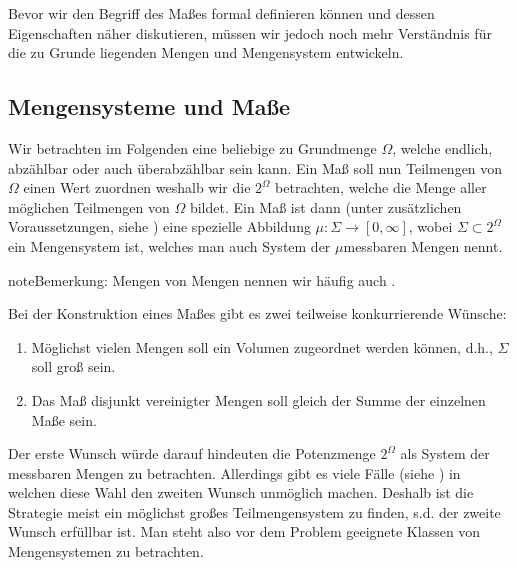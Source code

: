 \documentclass[letterpaper,10pt,german]{jupyterBook}
\begin{document}
\sphinxAtStartPar
Bevor wir den Begriff des Maßes formal definieren können und dessen Eigenschaften näher diskutieren, müssen wir jedoch noch mehr Verständnis für die zu Grunde liegenden Mengen und Mengensystem entwickeln.


\subsection{Mengensysteme und Maße}
\label{\detokenize{masstheorie/masstheorie:mengensysteme-und-masze}}\label{\detokenize{masstheorie/masstheorie:s-sigmaalg}}
\sphinxAtStartPar
Wir betrachten im Folgenden eine beliebige zu Grundmenge \(\Omega\), welche endlich, abzählbar oder auch überabzählbar sein kann. Ein Maß soll nun Teilmengen von \(\Omega\) einen Wert zuordnen weshalb wir die  \(2^\Omega\) betrachten, welche die Menge aller möglichen Teilmengen von \(\Omega\) bildet. Ein Maß ist dann (unter zusätzlichen Voraussetzungen, siehe {\hyperref[\detokenize{masstheorie/masstheorie:def:mass}]{}}) eine spezielle Abbildung \(\mu:\Sigma\to[0,\infty]\), wobei \(\Sigma\subset 2^\Omega\) ein Mengensystem ist, welches man auch System der \(\mu\)\sphinxhyphen{}messbaren Mengen nennt.

\begin{sphinxadmonition}{note}{Bemerkung:}
\sphinxAtStartPar
Mengen von Mengen nennen wir häufig auch .
\end{sphinxadmonition}

\sphinxAtStartPar
Bei der Konstruktion eines Maßes gibt es zwei teilweise konkurrierende Wünsche:
\begin{enumerate}
%
\item {} 
\sphinxAtStartPar
Möglichst vielen Mengen soll ein Volumen zugeordnet werden können, d.h., \(\Sigma\) soll groß sein.

\item {} 
\sphinxAtStartPar
Das Maß disjunkt vereinigter Mengen soll gleich der Summe der einzelnen Maße sein.

\end{enumerate}

\sphinxAtStartPar
Der erste Wunsch würde darauf hindeuten die Potenzmenge \(2^\Omega\) als System der messbaren Mengen zu betrachten. Allerdings gibt es viele Fälle (siehe {\hyperref[\detokenize{masstheorie/masstheorie:s-vitali}]{}}) in welchen diese Wahl den zweiten Wunsch unmöglich machen. Deshalb ist die Strategie meist ein möglichst großes Teilmengensystem zu finden, s.d. der zweite Wunsch erfüllbar ist. Man steht also vor dem Problem geeignete Klassen von Mengensystemen zu betrachten.
\end{document}
